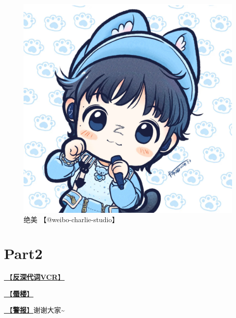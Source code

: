 \documentclass[]{ctexbook}
\begin{document}
\begin{figure}

{\centering \includegraphics[width=400pt]{img/guiyang20240713/001} 

}

\caption{绝美 【@weibo-charlie-studio】}\label{fig:unnamed-chunk-53}
\end{figure}

\section{Part2}\label{guiyang-20240713-part2}

\hyperref[senself-vcr]{🎥【\textbf{反深代词VCR}】}

\hyperref[mirage]{🎵【\textbf{蜃楼}】}

\hyperref[the-giver]{🎵【\textbf{警报}】}谢谢大家\textasciitilde{}
\end{document}
